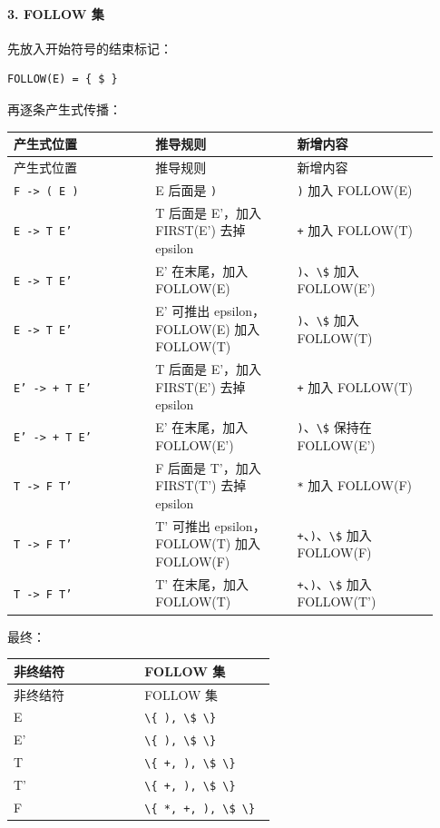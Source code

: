 \documentclass[UTF8]{ctexart}
\begin{document}
\paragraph*{3. FOLLOW 集}

先放入开始符号的结束标记：

\begin{Verbatim}[fontsize=\small,breaklines=true]
FOLLOW(E) = { $ }
\end{Verbatim}

再逐条产生式传播：

\begin{longtable}{|p{0.31\linewidth}|p{0.31\linewidth}|p{0.31\linewidth}|}
\hline
产生式位置 & 推导规则 & 新增内容 \\
\hline
\endfirsthead
产生式位置 & 推导规则 & 新增内容 \\
\hline
\endhead
\texttt{F -> ( E )} & E 后面是 \texttt{)} & \texttt{)} 加入 FOLLOW(E) \\
\hline
\texttt{E -> T E'} & T 后面是 E'，加入 FIRST(E') 去掉 epsilon & \texttt{+} 加入 FOLLOW(T) \\
\hline
\texttt{E -> T E'} & E' 在末尾，加入 FOLLOW(E) & \texttt{)}、\texttt{\textbackslash{}\$} 加入 FOLLOW(E') \\
\hline
\texttt{E -> T E'} & E' 可推出 epsilon，FOLLOW(E) 加入 FOLLOW(T) & \texttt{)}、\texttt{\textbackslash{}\$} 加入 FOLLOW(T) \\
\hline
\texttt{E' -> + T E'} & T 后面是 E'，加入 FIRST(E') 去掉 epsilon & \texttt{+} 加入 FOLLOW(T) \\
\hline
\texttt{E' -> + T E'} & E' 在末尾，加入 FOLLOW(E') & \texttt{)}、\texttt{\textbackslash{}\$} 保持在 FOLLOW(E') \\
\hline
\texttt{T -> F T'} & F 后面是 T'，加入 FIRST(T') 去掉 epsilon & \texttt{*} 加入 FOLLOW(F) \\
\hline
\texttt{T -> F T'} & T' 可推出 epsilon，FOLLOW(T) 加入 FOLLOW(F) & \texttt{+}、\texttt{)}、\texttt{\textbackslash{}\$} 加入 FOLLOW(F) \\
\hline
\texttt{T -> F T'} & T' 在末尾，加入 FOLLOW(T) & \texttt{+}、\texttt{)}、\texttt{\textbackslash{}\$} 加入 FOLLOW(T') \\
\hline
\end{longtable}

最终：

\begin{longtable}{|p{0.47\linewidth}|p{0.47\linewidth}|}
\hline
非终结符 & FOLLOW 集 \\
\hline
\endfirsthead
非终结符 & FOLLOW 集 \\
\hline
\endhead
E & \texttt{\textbackslash{}\{ ), \textbackslash{}\$ \textbackslash{}\}} \\
\hline
E' & \texttt{\textbackslash{}\{ ), \textbackslash{}\$ \textbackslash{}\}} \\
\hline
T & \texttt{\textbackslash{}\{ +, ), \textbackslash{}\$ \textbackslash{}\}} \\
\hline
T' & \texttt{\textbackslash{}\{ +, ), \textbackslash{}\$ \textbackslash{}\}} \\
\hline
F & \texttt{\textbackslash{}\{ *, +, ), \textbackslash{}\$ \textbackslash{}\}} \\
\hline
\end{longtable}
\end{document}
